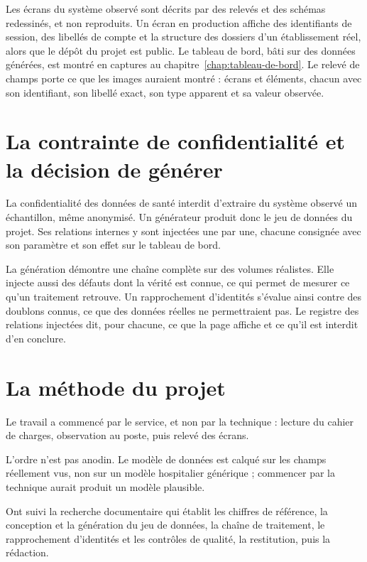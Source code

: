 \medskip

Les écrans du système observé sont décrits par des relevés et des schémas redessinés, et non
reproduits. Un écran en production affiche des identifiants de session, des libellés de compte et
la structure des dossiers d'un établissement réel, alors que le dépôt du projet est public. Le
tableau de bord, bâti sur des données générées, est montré en captures au
chapitre~\ref{chap:tableau-de-bord}. Le relevé de champs porte ce que les
images auraient montré :  écrans et  éléments,
chacun avec son identifiant, son libellé exact, son type apparent et sa valeur observée.

\section{La contrainte de confidentialité et la décision de générer}

La confidentialité des données de santé interdit d'extraire du système observé un échantillon, même
anonymisé. Un générateur produit donc le jeu de données du projet. Ses relations internes y sont
injectées une par une, chacune consignée avec son paramètre et son effet sur le tableau de bord.

La génération démontre une chaîne complète sur des volumes réalistes. Elle injecte aussi des défauts
dont la vérité est connue, ce qui permet de mesurer ce qu'un traitement retrouve. Un rapprochement
d'identités s'évalue ainsi contre des doublons connus, ce que des données réelles ne permettraient
pas. Le registre des relations injectées dit, pour chacune, ce que la page affiche et ce qu'il est
interdit d'en conclure.

\section{La méthode du projet}

Le travail a commencé par le service, et non par la technique : lecture du cahier de charges,
observation au poste, puis relevé des écrans.

L'ordre n'est pas anodin. Le modèle de données est calqué sur les champs réellement vus, non sur un
modèle hospitalier générique ; commencer par la technique aurait produit un modèle plausible.

Ont suivi la recherche documentaire qui établit les chiffres de référence, la conception et la
génération du jeu de données, la chaîne de traitement, le rapprochement d'identités et les
contrôles de qualité, la restitution, puis la rédaction.

